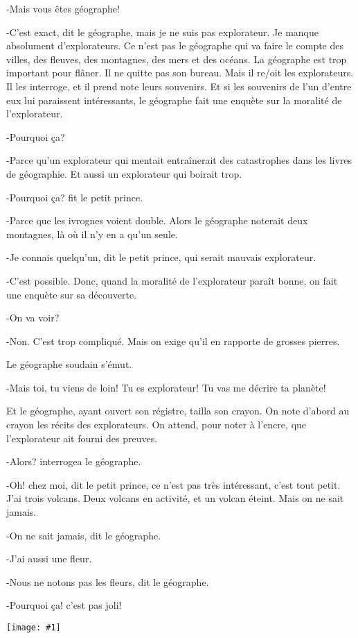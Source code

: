 \documentclass{report}
\newcommand{\incpic}[1]{%
\begin{center}
    \texttt{[image: \#1]}
\end{center}%
}
\begin{document}
-Mais vous êtes géographe!

-C'est exact, dit le géographe, mais je ne suis pas explorateur. Je manque absolument d'explorateurs. Ce n'est pas le géographe qui va faire le compte des villes, des fleuves, des montagnes, des mers et des océans. La géographe est trop important pour flâner. Il ne quitte pas son bureau. Mais il re/oit les explorateurs. Il les interroge, et il prend note leurs souvenirs. Et si les souvenirs de l'un d'entre eux lui paraissent intéressants, le géographe fait une enquète sur la moralité de l'explorateur.

-Pourquoi ça?

-Parce qu'un explorateur qui mentait entraînerait des catastrophes dans les livres de géographie. Et aussi un explorateur qui boirait trop.

-Pourquoi ça? fit le petit prince.

-Parce que les ivrognes voient double. Alors le géographe noterait deux montagnes, là où il n'y en a qu'un seule.

-Je connais quelqu'un, dit le petit prince, qui serait mauvais explorateur.

-C'est possible. Donc, quand la moralité de l'explorateur paraît bonne, on fait une enquète sur sa découverte.

-On va voir?

-Non. C'est trop compliqué. Mais on exige qu'il en rapporte de grosses pierres.

Le géographe soudain s'émut.

-Mais toi, tu viens de loin! Tu es explorateur! Tu vas me décrire ta planète!

Et le géographe, ayant ouvert son régistre, tailla son crayon. On note d'abord au crayon les récits des explorateurs. On attend, pour noter à l'encre, que l'explorateur ait fourni des preuves.

-Alors? interrogea le géographe.

-Oh! chez moi, dit le petit prince, ce n'est pas très intéressant, c'est tout petit. J'ai trois volcans. Deux volcans en activité, et un volcan éteint. Mais on ne sait jamais.

-On ne sait jamais, dit le géographe.

-J'ai aussi une fleur.

-Nous ne notons pas les fleurs, dit le géographe.

-Pourquoi ça! c'est pas joli!

\incpic{pic/image31.png}
\end{document}
